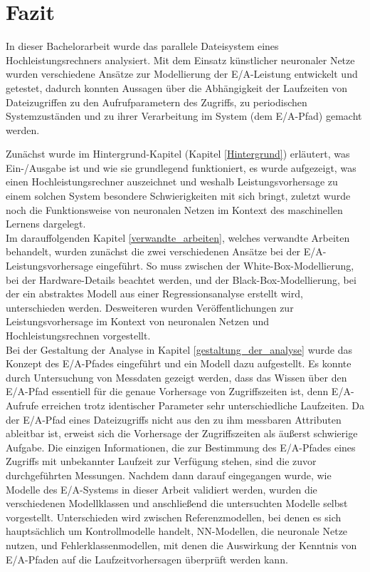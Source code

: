 \documentclass[
	twoside,
	12pt,
	a4paper,
	BCOR10mm,
	DIV14,
	listof=totoc,
	bibliography=totoc,
	headsepline
]{scrreprt}
\begin{document}
\chapter{Fazit}
\label{Fazit}
In dieser Bachelorarbeit wurde das parallele Dateisystem eines Hochleistungsrechners analysiert.
Mit dem Einsatz künstlicher neuronaler Netze wurden verschiedene Ansätze zur Modellierung der E/A-Leistung entwickelt und getestet, dadurch konnten Aussagen über die Abhängigkeit der Laufzeiten von Dateizugriffen zu den Aufrufparametern des Zugriffs, zu periodischen Systemzuständen und zu ihrer Verarbeitung im System (dem E/A-Pfad) gemacht werden.\medskip

Zunächst wurde im Hintergrund-Kapitel (Kapitel \ref{Hintergrund}) erläutert, was Ein-/Ausgabe ist und wie sie grundlegend funktioniert, es wurde aufgezeigt, was einen Hochleistungsrechner auszeichnet und weshalb Leistungsvorhersage zu einem solchen System besondere Schwierigkeiten mit sich bringt, zuletzt wurde noch die Funktionsweise von neuronalen Netzen im Kontext des maschinellen Lernens dargelegt.\\
Im darauffolgenden Kapitel \ref{verwandte_arbeiten}, welches verwandte Arbeiten behandelt, wurden zunächst die zwei verschiedenen Ansätze bei der E/A-Leistungsvorhersage eingeführt. So muss zwischen der White-Box-Modellierung, bei der Hardware-Details beachtet werden, und der Black-Box-Modellierung, bei der ein abstraktes Modell aus einer Regressionsanalyse erstellt wird, unterschieden werden. Desweiteren wurden Veröffentlichungen zur Leistungsvorhersage im Kontext von neuronalen Netzen und Hochleistungsrechnen vorgestellt.\\
Bei der Gestaltung der Analyse in Kapitel \ref{gestaltung_der_analyse} wurde das Konzept des E/A-Pfades eingeführt und ein Modell dazu aufgestellt. Es konnte durch Untersuchung von Messdaten gezeigt werden, dass das Wissen über den E/A-Pfad essentiell für die genaue Vorhersage von Zugriffszeiten ist, denn E/A-Aufrufe erreichen trotz identischer Parameter sehr unterschiedliche Laufzeiten.
Da der E/A-Pfad eines Dateizugriffs nicht aus den zu ihm messbaren Attributen ableitbar ist, erweist sich die Vorhersage der Zugriffszeiten als äußerst schwierige Aufgabe. Die einzigen Informationen, die zur Bestimmung des E/A-Pfades eines Zugriffs mit unbekannter Laufzeit zur Verfügung stehen, sind die zuvor durchgeführten Messungen.
Nachdem dann darauf eingegangen wurde, wie Modelle des E/A-Systems in dieser Arbeit validiert werden, wurden die verschiedenen Modellklassen und anschließend die untersuchten Modelle selbst vorgestellt. Unterschieden wird zwischen Referenzmodellen, bei denen es sich hauptsächlich um Kontrollmodelle handelt, NN-Modellen, die neuronale Netze nutzen, und Fehlerklassenmodellen, mit denen die Auswirkung der Kenntnis von E/A-Pfaden auf die Laufzeitvorhersagen überprüft werden kann.
\end{document}
